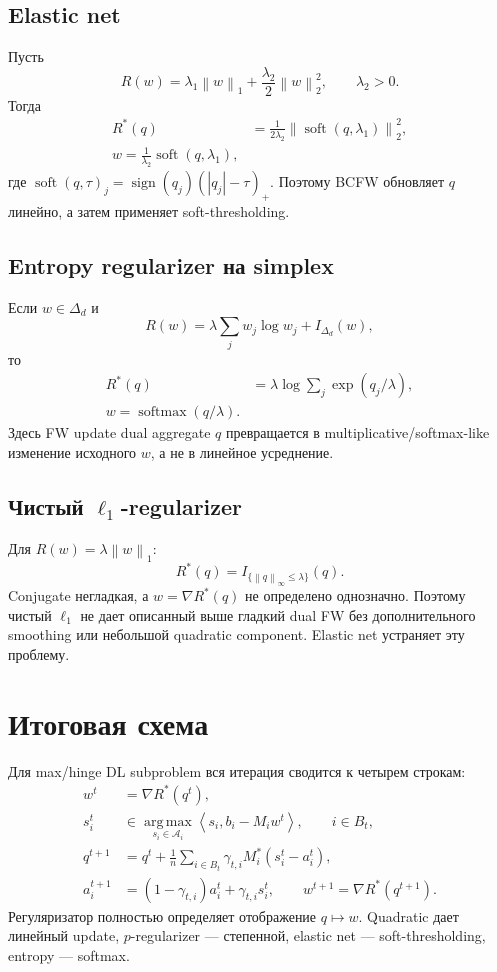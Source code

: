 \documentclass[11pt,a4paper]{article}
\newcommand{\A}{\mathcal{A}}
\newcommand{\ip}[2]{\left\langle #1,#2\right\rangle}
\newcommand{\norm}[1]{\left\lVert #1\right\rVert}
\newcommand{\argmax}{\operatorname*{arg\,max}}
\newcommand{\soft}{\operatorname{soft}}
\begin{document}
\subsection{Elastic net}

Пусть
\[
  R(w)=\lambda_1\norm{w}_1+\frac{\lambda_2}{2}\norm{w}_2^2,
  \qquad \lambda_2>0.
\]
Тогда
\begin{align}
  R^*(q)&=\frac1{2\lambda_2}
  \norm{\soft(q,\lambda_1)}_2^2,\\
  \boxed{
  w=\frac1{\lambda_2}\soft(q,\lambda_1),}
\end{align}
где \(\soft(q,\tau)_j=\operatorname{sign}(q_j)(|q_j|-\tau)_+\). Поэтому BCFW обновляет \(q\) линейно, а затем применяет soft-thresholding.

\subsection{Entropy regularizer на simplex}

Если \(w\in\Delta_d\) и
\[
  R(w)=\lambda\sum_jw_j\log w_j+I_{\Delta_d}(w),
\]
то
\begin{align}
  R^*(q)&=\lambda\log\sum_j\exp(q_j/\lambda),\\
  \boxed{w=\operatorname{softmax}(q/\lambda).}
\end{align}
Здесь FW update dual aggregate \(q\) превращается в multiplicative/softmax-like изменение исходного \(w\), а не в линейное усреднение.

\subsection{Чистый \(\ell_1\)-regularizer}

Для \(R(w)=\lambda\norm{w}_1\):
\[
  R^*(q)=I_{\{\norm{q}_\infty\le\lambda\}}(q).
\]
Conjugate негладкая, а \(w=\nabla R^*(q)\) не определено однозначно. Поэтому чистый \(\ell_1\) не дает описанный выше гладкий dual FW без дополнительного smoothing или небольшой quadratic component. Elastic net устраняет эту проблему.

\section{Итоговая схема}

Для max/hinge DL subproblem вся итерация сводится к четырем строкам:
\begin{align*}
  w^t&=\nabla R^*(q^t),\\
  s_i^t&\in\argmax_{s_i\in\A_i}\ip{s_i}{b_i-M_iw^t},
  \qquad i\in B_t,\\
  q^{t+1}&=q^t+\frac1n\sum_{i\in B_t}
  \gamma_{t,i}M_i^*(s_i^t-a_i^t),\\
  a_i^{t+1}&=(1-\gamma_{t,i})a_i^t+\gamma_{t,i}s_i^t,
  \qquad
  w^{t+1}=\nabla R^*(q^{t+1}).
\end{align*}
Регуляризатор полностью определяет отображение \(q\mapsto w\). Quadratic дает линейный update, \(p\)-regularizer --- степенной, elastic net --- soft-thresholding, entropy --- softmax.
\end{document}
